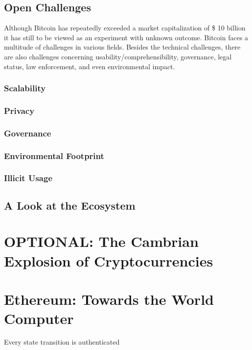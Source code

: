 \subsection{Open Challenges}
\label{sec:btc_challenges}

Although Bitcoin has repeatedly exceeded a market capitalization of \$ 10 billion it has still to be viewed as an experiment with unknown outcome. Bitcoin faces a multitude of challenges in various fields. Besides the technical challenges, there are also challenges concerning usability/comprehensibility, governance, legal status, law enforcement, and even environmental impact. 

\subsubsection{Scalability}

\subsubsection{Privacy}

\subsubsection{Governance}

\subsubsection{Environmental Footprint}

\subsubsection{Illicit Usage}


\subsection{A Look at the Ecosystem}


\section{OPTIONAL: The Cambrian Explosion of Cryptocurrencies}

\section{Ethereum: Towards the World Computer}

Every state transition is authenticated 

